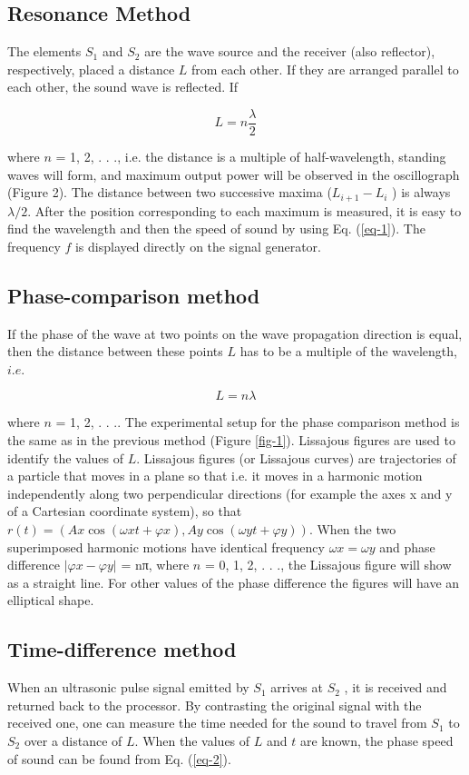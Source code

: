 \documentclass{article}
\begin{document}
\subsection{Resonance Method}

The elements $S_1$ and $S_2$ are the wave source and the receiver (also reflector), respectively, placed a distance $L$ from each other. If they are arranged parallel to each other,
the sound wave is reflected. If

\begin{equation}\label{eq-3}
L=n\frac{\lambda}{2}
\end{equation}

where $n$ = 1, 2, . . ., i.e. the distance is a multiple of half-wavelength, standing waves will
form, and maximum output power will be observed in the oscillograph (Figure 2). The
distance between two successive maxima ($L_{i+1}-L_i$ ) is always $\lambda/2$. After the position
corresponding to each maximum is measured, it is easy to find the wavelength and then
the speed of sound by using Eq. (\ref{eq-1}). The frequency $f$ is displayed directly on the signal
generator.

\subsection{Phase-comparison method}
If the phase of the wave at two points on the wave propagation direction is equal, then
the distance between these points $L$ has to be a multiple of the wavelength, $i.e.$

$$ L=n\lambda $$

where $n$ = 1, 2, . . .. The experimental setup for the phase comparison method is the same
as in the previous method (Figure \ref{fig-1}). Lissajous figures are used to identify the values of
$L$. Lissajous figures (or Lissajous curves) are trajectories of a particle that moves in a
plane so that i.e. it moves in a harmonic motion independently along two perpendicular
directions (for example the axes x and y of a Cartesian coordinate system), so that $r(t)=(Ax\cos(\omega x t+\varphi x),Ay\cos(\omega yt+\varphi y))$. When the two superimposed harmonic motions have
identical frequency $\omega x = \omega y$ and phase difference $|\varphi x − \varphi y |$ = nπ, where $n$ = 0, 1, 2, . . .,
the Lissajous figure will show as a straight line. For other values of the phase difference
the figures will have an elliptical shape.

\subsection{Time-difference method}
When an ultrasonic pulse signal emitted by $S_1$ arrives at $S_2$ , it is received and returned
back to the processor. By contrasting the original signal with the received one, one can
measure the time needed for the sound to travel from $S_1$ to $S_2$ over a distance of $L$. When
the values of $L$ and $t$ are known, the phase speed of sound can be found from Eq. (\ref{eq-2}).
\end{document}
